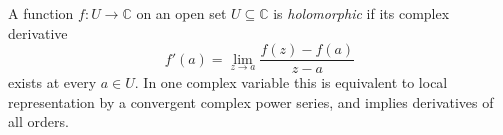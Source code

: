 
A function $f:U\to\mathbb C$ on an open set $U\subseteq\mathbb C$ is \emph{holomorphic} if its complex derivative
\[
f'(a)=\lim_{z\to a}\frac{f(z)-f(a)}{z-a}
\]
exists at every $a\in U$. In one complex variable this is equivalent to local representation by a convergent complex power series, and implies derivatives of all orders.
